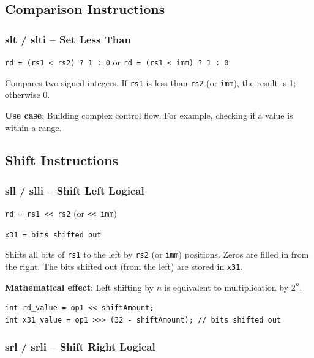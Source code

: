 \documentclass[12pt,a4paper]{article}
\begin{document}
\subsection{Comparison Instructions}

\subsubsection{slt / slti -- Set Less Than}

\begin{tcolorbox}[colback=purple!5, colframe=purple!50!black]
\texttt{rd = (rs1 < rs2) ? 1 : 0} \quad or \quad \texttt{rd = (rs1 < imm) ? 1 : 0}
\end{tcolorbox}

Compares two signed integers. If \texttt{rs1} is less than \texttt{rs2} (or \texttt{imm}), the result is 1; otherwise 0.

\textbf{Use case}: Building complex control flow. For example, checking if a value is within a range.

\subsection{Shift Instructions}

\subsubsection{sll / slli -- Shift Left Logical}

\begin{tcolorbox}[colback=orange!5, colframe=orange!50!black]
\texttt{rd = rs1 << rs2} (or \texttt{<< imm})

\texttt{x31 = bits shifted out}
\end{tcolorbox}

Shifts all bits of \texttt{rs1} to the left by \texttt{rs2} (or \texttt{imm}) positions. Zeros are filled in from the right. The bits shifted out (from the left) are stored in \texttt{x31}.

\textbf{Mathematical effect}: Left shifting by $n$ is equivalent to multiplication by $2^n$.

\begin{lstlisting}[style=javastyle]
int rd_value = op1 << shiftAmount;
int x31_value = op1 >>> (32 - shiftAmount); // bits shifted out
\end{lstlisting}

\subsubsection{srl / srli -- Shift Right Logical}
\end{document}
